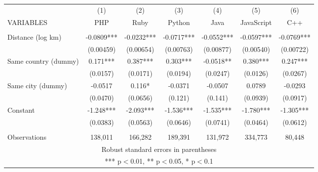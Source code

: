 \begin{tabular}{lcccccc} \hline
 & (1) & (2) & (3) & (4) & (5) & (6) \\
VARIABLES & PHP & Ruby & Python & Java & JavaScript & C++ \\ \hline
 &  &  &  &  &  &  \\
Distance (log km) & -0.0809*** & -0.0232*** & -0.0717*** & -0.0552*** & -0.0597*** & -0.0769*** \\
 & (0.00459) & (0.00654) & (0.00763) & (0.00877) & (0.00540) & (0.00722) \\
Same country (dummy) & 0.171*** & 0.387*** & 0.303*** & -0.0518** & 0.380*** & 0.247*** \\
 & (0.0157) & (0.0171) & (0.0194) & (0.0247) & (0.0126) & (0.0267) \\
Same city (dummy) & -0.0517 & 0.116* & -0.0371 & -0.0507 & 0.0789 & -0.0293 \\
 & (0.0470) & (0.0656) & (0.121) & (0.141) & (0.0939) & (0.0917) \\
Constant & -1.248*** & -2.093*** & -1.536*** & -1.535*** & -1.780*** & -1.305*** \\
 & (0.0383) & (0.0563) & (0.0646) & (0.0741) & (0.0464) & (0.0612) \\
 &  &  &  &  &  &  \\
 Observations & 138,011 & 166,282 & 189,391 & 131,972 & 334,773 & 80,448 \\ \hline
\multicolumn{7}{c}{ Robust standard errors in parentheses} \\
\multicolumn{7}{c}{ *** p$<$0.01, ** p$<$0.05, * p$<$0.1} \\
\end{tabular}
